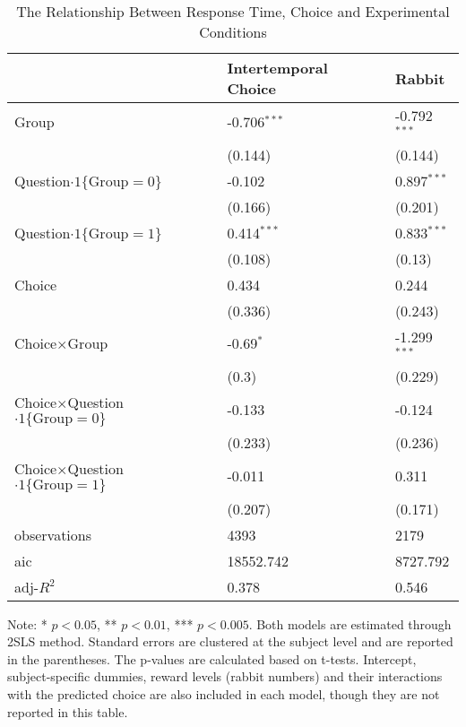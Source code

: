 \documentclass[12pt]{article}
\begin{document}
\begin{table}
    \caption{The Relationship Between Response Time, Choice and Experimental Conditions}
    \vspace*{12pt}
    \centering

      \begin{tabular}{lll}
\hline
 & Intertemporal Choice & Rabbit \\
\hline
Group & -0.706$^{***}$ & -0.792$^{***}$ \\
 & (0.144) & (0.144) \\
Question$\cdot1\{\text{Group}=0\}$ & -0.102 & 0.897$^{***}$ \\
 & (0.166) & (0.201) \\
Question$\cdot1\{\text{Group}=1\}$ & 0.414$^{***}$ & 0.833$^{***}$ \\
 & (0.108) & (0.13) \\
Choice & 0.434 & 0.244 \\
 & (0.336) & (0.243) \\
Choice$\times$Group & -0.69$^{*}$ & -1.299$^{***}$ \\
 & (0.3) & (0.229) \\
Choice$\times$Question$\cdot1\{\text{Group}=0\}$ & -0.133 & -0.124 \\
 & (0.233) & (0.236) \\
Choice$\times$Question$\cdot1\{\text{Group}=1\}$ & -0.011 & 0.311 \\
 & (0.207) & (0.171) \\\hline

observations & 4393 & 2179 \\
aic & 18552.742 & 8727.792 \\
adj-$R^2$ & 0.378 & 0.546 \\
\hline
\end{tabular}

    \vspace*{4pt}
    \centering
    \begin{minipage}{0.85\textwidth}
    {\par\footnotesize Note: * $p<0.05$, ** $p<0.01$, *** $p<0.005$. Both models are estimated through 2SLS method. Standard errors are clustered at the subject level and are reported in the parentheses. The p-values are calculated based on t-tests. Intercept, subject-specific dummies, reward levels (rabbit numbers) and their interactions with the predicted choice are also included in each model, though they are not reported in this table.}
    \end{minipage}
    \label{tab:exp3_reg_response_time}
\end{table}
\end{document}
